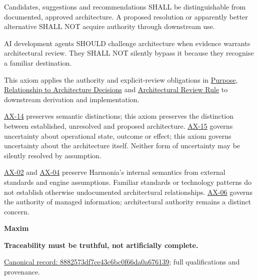 Candidates, suggestions and recommendations SHALL be distinguishable from
documented, approved architecture. A proposed resolution or apparently
better alternative SHALL NOT acquire authority through downstream use.



AI development agents SHOULD challenge architecture when evidence
warrants architectural review. They SHALL NOT silently bypass it because
they recognise a familiar destination.



This axiom applies the authority and explicit-review obligations in
\href{\detokenize{../../../../../../../governance/architectural-axioms.md#1-purpose}}{Purpose}, \href{\detokenize{../../../../../../../governance/architectural-axioms.md#6-relationship-to-architecture-decisions}}{Relationship to Architecture Decisions}
and \href{\detokenize{../../../../../../../governance/architectural-axioms.md#7-architectural-review-rule}}{Architectural Review Rule} to downstream
derivation and implementation.



\hyperref[element:d3fc6025dc7646d1b2020b51f7a44bfa]{AX-14} preserves semantic
distinctions; this axiom preserves the distinction between established,
unresolved and proposed architecture.
\hyperref[element:ef8abbaec37e4890ad78b9f263e67906]{AX-15} governs uncertainty
about operational state, outcome or effect; this axiom governs uncertainty
about the architecture itself. Neither form of uncertainty may be silently
resolved by assumption.



\hyperref[element:eee8c3783d964d18a7f9dcea85fcd4cf]{AX-02}
and \hyperref[element:54508cda80484a6caf95b901780eaf7d]{AX-04}
preserve Harmonia's internal semantics from external standards and engine
assumptions. Familiar standards or technology patterns do not establish
otherwise undocumented architectural relationships.
\hyperref[element:952c3b6148ce4fce94b69f99a0c2fec7]{AX-06} governs the authority
of managed information; architectural authority remains a distinct concern.



\par\medskip\textbf{Maxim}\par


\textbf{Traceability must be truthful, not artificially complete.}


{\footnotesize \href{../../../../../../../continuum/motivation/principle/8882573df7ce43c6bc0f66da0a676139.md}{Canonical record: 8882573df7ce43c6bc0f66da0a676139}; full qualifications and provenance.}\par

